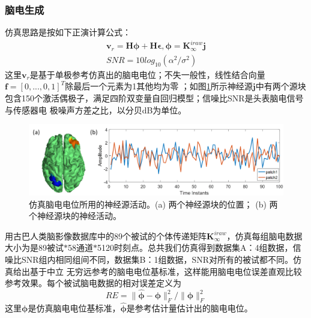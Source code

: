 \subsubsection{脑电生成}
仿真思路是按如下正演计算公式：
\begin{equation}\label{eq3.18}
\begin{aligned}
\mathbf{v}_r=\mathbf{H\phi}+\mathbf{H\epsilon},\mathbf{\phi}=\mathbf{K}_{\infty}^{iraw}\mathbf{j}\\
SNR=10log_{10}(\alpha^2/\sigma^2)
\end{aligned}
\end{equation}
这里$\mathbf{v}_r$是基于单极参考仿真出的脑电电位；不失一般性，线性结合向量$\mathbf{f}=[0,...,0,1]^T$除最后一个元素为1其他均为零
；如图\ref{3.3}所示神经源$\mathbf{j}$中有两个源块包含150个激活偶极子，满足四阶双变量自回归模型；信噪比SNR是头表脑电信号与传感器电
极噪声方差之比，以分贝dB为单位。
\begin{figure}[!h]
	\centering
	\includegraphics[width=15cm]{pic/Frontier/figure3.png}
	\caption{仿真脑电电位所用的神经源活动。(a) 两个神经源块的位置； (b) 两个神经源块的神经活动。}
	\label{3.3}
\end{figure}
用古巴人类脑影像数据库中的89个被试的个体传递矩阵$\mathbf{K}_{\infty}^{iraw}$，仿真每组脑电数据大小为是89被试$\ast$58通道$\ast$5120时刻点。总共我们仿真得到数据集A：4组数据，信噪比SNR组内相同组间不同，数据集B：1组数据，SNR对所有的被试都不同。仿真给出基于中立
无穷远参考的脑电电位基标准，这样能用脑电电位误差直观比较参考效果。每个被试脑电数据的相对误差定义为
\begin{equation}\label{eq3.19}
RE=\lVert\hat{\mathbf{\phi}}-\mathbf{\phi}\rVert^2_F/{\lVert\mathbf{\phi}\rVert^2_F}
\end{equation}
这里$\mathbf{\phi}$是仿真脑电电位基标准，$\hat{\mathbf{\phi}}$是参考估计量估计出的脑电电位。

